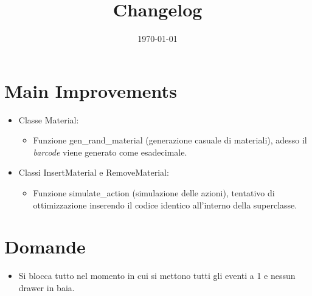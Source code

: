 \documentclass[a4paper]{article}
\begin{document}
	\title{Changelog}
	\date{\today}
	\maketitle
	
	\newpage
	
	\section*{Main Improvements}
	\begin{itemize}[label=]
		\item Classe \textsf{Material}:
		\begin{itemize}
			\item Funzione \textsf{gen\_rand\_material} (generazione casuale di materiali), adesso il \emph{barcode} viene generato come esadecimale.
		\end{itemize}
	
		\item Classi \textsf{InsertMaterial} e \textsf{RemoveMaterial}:
		\begin{itemize}
			\item Funzione \textsf{simulate\_action} (simulazione delle azioni), tentativo di ottimizzazione inserendo il codice identico all'interno della superclasse.
		\end{itemize}
	\end{itemize}
	
	\section*{Domande}
	\begin{itemize}
		\item Si blocca tutto nel momento in cui si mettono tutti gli eventi a 1 e nessun drawer in baia.
	\end{itemize}
\end{document}
